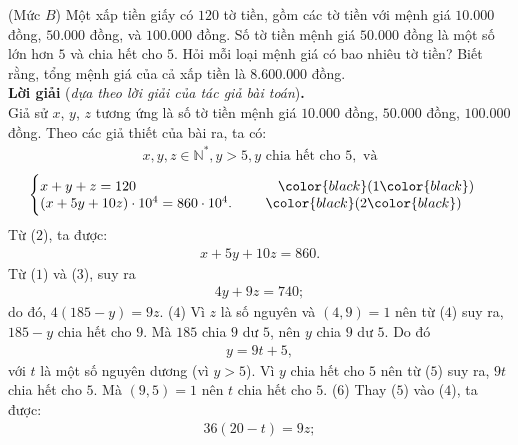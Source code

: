 \begin{multicols}{2}
	\setlength{\abovedisplayskip}{4pt}
	\setlength{\belowdisplayskip}{4pt}
	{}
	(Mức $B$) Một xấp tiền giấy có $120$ tờ tiền, gồm các tờ tiền với mệnh giá $10{.}000$ đồng, $50{.}000$ đồng, và $100{.}000$ đồng. Số tờ tiền mệnh giá $50{.}000$ đồng là một số lớn hơn $5$ và chia hết cho $5$. Hỏi mỗi loại mệnh giá có bao nhiêu tờ tiền? Biết rằng, tổng mệnh giá của cả xấp tiền là $8{.}600{.}000$ đồng.\\
	\textbf{\color{thachthuctoanhoc}Lời giải} (\textit{dựa theo lời giải của tác giả bài toán})\textbf{\color{thachthuctoanhoc}.}\\
	Giả sử $x$, $y$, $z$ tương ứng là số tờ tiền mệnh giá $10{.}000$ đồng, $50{.}000$ đồng, $100{.}000$ đồng.
	\vskip 0.01cm
	Theo các giả thiết của bài ra, ta có:
	\begin{align*}
		x,y,z \in \mathbb{N^*}, y > 5, y \text{ chia hết cho } 5, \text{ và}
	\end{align*}
	\begin{align*}
		\begin{cases}
			x + y + z = 120  \hspace*{102pt} {\color{black}(}1{\color{black})} \\[-0.5ex]
			(x + 5y + 10z) \cdot 10^4 = 860 \cdot 10^4.\hspace*{24pt} {\color{black}(}2{\color{black})} 
		\end{cases}
	\end{align*}
	Từ ($2$), ta được:
	\begin{align*}
		x + 5y + 10z = 860. \tag{$3$}
	\end{align*}
	Từ ($1$) và ($3$), suy ra
	\begin{align*}
		4y + 9z = 740;
	\end{align*}
	do đó, $4(185-y)= 9z$. \hfill ($4$)
	\vskip 0.05cm
	Vì $z$ là số nguyên và $(4, 9) = 1$ nên từ ($4$) suy ra, $185 - y$ chia hết cho $9$. Mà $185$ chia $9$ dư $5$, nên $y$ chia $9$ dư $5$. Do đó
	\begin{align*}
		y = 9t + 5,  \tag{$5$}
	\end{align*}
	với $t$ là một số nguyên dương (vì $y > 5$).
	\vskip 0.05cm
	Vì $y$ chia hết cho $5$ nên từ ($5$) suy ra, $9t$ chia hết cho $5$.
	\vskip 0.05cm
	Mà $(9, 5) = 1$ nên $t$ chia hết cho $5$.       \hfill           ($6$)
	\vskip 0.05cm
	Thay ($5$) vào ($4$), ta được:
	\begin{align*}
		36\left( {20 - t} \right) = 9z;
	\end{align*}

\end{multicols}
